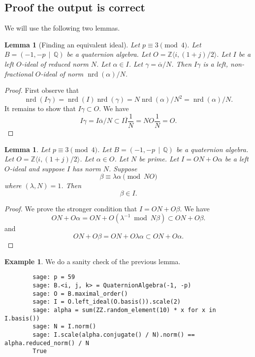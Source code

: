 \documentclass[10pt]{article}
\theoremstyle{plain}
\newtheorem{lemma}[theorem]{Lemma}
\theoremstyle{definition}
\newtheorem{example}[theorem]{Example}
\newcommand{\op}{\operatorname}
\newcommand{\Z}{\mathbb{Z}}
\newcommand{\Q}{\mathbb{Q}}
\newcommand{\nrd}{\op{nrd}}
\begin{document}
\subsection{Proof the output is correct}
We will use the following two lemmas.
\begin{lemma}[Finding an equivalent ideal] \label{lem: change norm}
    Let \( p \equiv 3 \pmod{4} \).
    Let \( B =  (-1, -p \, \mid \, \Q) \) be a quaternion algebra.
    Let \( O = \Z \langle i, (1+j) / 2 \rangle \).
    Let \( I \) be a left \( O \)-ideal of reduced norm \( N \).
    Let \( \alpha \in I \).
    Let \( \gamma = \overline{\alpha} / N \).
    Then \( I \gamma \) is a left, non-fractional \( O \)-ideal of norm \( \nrd(\alpha) / N \).
\end{lemma}
\begin{proof}
    First observe that
    \[
        \nrd(I \gamma) = \nrd(I)\nrd(\gamma) = N \nrd(\alpha) / N^2 = \nrd(\alpha) / N.
    \]
    It remains to show that \( I\gamma \subset O \).
    We have
    \[
        I\gamma = I\overline{\alpha} / N \subset I\overline{I} \frac{1}{N} = NO \frac{1}{N} = O.
    \]
\end{proof}

\begin{lemma} \label{lem: beta in I}
    Let \( p \equiv 3 \pmod{4} \).
    Let \( B =  (-1, -p \, \mid \, \Q) \) be a quaternion algebra.
    Let \( O = \Z \langle i, (1+j) / 2 \rangle \).
    Let \( \alpha \in O \).
    Let \( N \) be prime.
    Let \( I = ON + O\alpha \) be a left \( O \)-ideal and suppose \( I \) has norm \( N \).
    Suppose
    \[
        \beta \equiv \lambda \alpha \pmod{NO}
    \]
    where \( (\lambda, N) = 1 \).
    Then
    \[
        \beta \in I.
    \]
\end{lemma}
\begin{proof}
    We prove the stronger condition that \( I = ON + O\beta \).
    We have
    \[
        ON + O\alpha
        = ON + O(\lambda^{-1} \bmod{N}\beta)
        \subset ON + O\beta .
    \]
    and
    \[
        ON + O\beta
        = ON + O\lambda \alpha
        \subset ON + O\alpha .
    \]
\end{proof}

\begin{example}
    We do a sanity check of the previous lemma.
    \begin{lstlisting}
        sage: p = 59
        sage: B.<i, j, k> = QuaternionAlgebra(-1, -p)
        sage: O = B.maximal_order()
        sage: I = O.left_ideal(O.basis()).scale(2)
        sage: alpha = sum(ZZ.random_element(10) * x for x in I.basis())
        sage: N = I.norm()
        sage: I.scale(alpha.conjugate() / N).norm() == alpha.reduced_norm() / N
        True
    \end{lstlisting}
\end{example}
\end{document}
